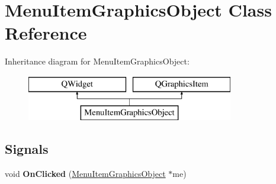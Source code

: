 \hypertarget{class_menu_item_graphics_object}{}\section{Menu\+Item\+Graphics\+Object Class Reference}
\label{class_menu_item_graphics_object}
Inheritance diagram for Menu\+Item\+Graphics\+Object\+:\begin{figure}[H]
\begin{center}
\leavevmode
\includegraphics[height=2.000000cm]{class_menu_item_graphics_object}
\end{center}
\end{figure}
\subsection*{Signals}
\begin{DoxyCompactItemize}
\item 
\mbox{\label{class_menu_item_graphics_object_a8cc186eece634847665b15f4ae58b426}} 
void {\bfseries On\+Clicked} (\hyperlink{class_menu_item_graphics_object}{Menu\+Item\+Graphics\+Object} $\ast$me)
\end{DoxyCompactItemize}
